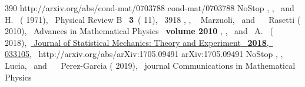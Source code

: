 \documentclass[rmp,aps,reprint,superscriptaddress,nobalancelastpage]{revtex4-1}
\begin{document}
\begin{thebibliography}{390}
    {http://arxiv.org/abs/cond-mat/0703788} {cond-mat/0703788} \BibitemShut
    {NoStop}%
    \BibitemOpen
     { {,
            }, \ and\  {\bibfnamefont
            {H.}~}} ( {1971}),\ \href@noop {}
    { { {Physical Review B}\ }\textbf
        { {3}}~( {11}),\ 
        {3918}}%
    \BibitemOpen
     { {,
    },  {~\bibnamefont
        {Marzuoli}}, \ and\  {~\bibnamefont
        {Rasetti}}} ( {2010}),\ \href@noop {} {
        { {Advances in Mathematical Physics}\ }\textbf {\bibinfo
            {volume} {2010}}}%
    \BibitemOpen
     { {,
            }, \ and\  {\bibfnamefont
            {A.}~}} ( {2018}),\ \href {\doibase
        10.1088/1742-5468/aaa793} { { {Journal
                of Statistical Mechanics: Theory and Experiment}\ }\textbf {
            {2018}},\  {033105}},\ \Eprint
    {http://arxiv.org/abs/arXiv:1705.09491} {arXiv:1705.09491} \BibitemShut
    {NoStop}%
    \BibitemOpen
     { {,
            },  {~\bibnamefont
            {Lucia}}, \ and\  {~\bibnamefont
            {Perez-Garcia}}} ( {2019}),\ \href@noop {} {\bibfield
        {journal} { {Communications in Mathematical Physics}\
}}
\end{thebibliography}
\end{document}
